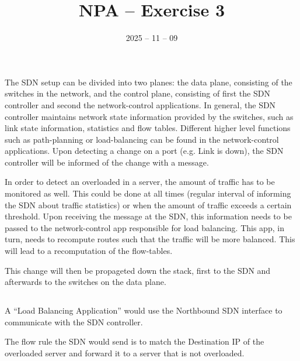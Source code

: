 \documentclass{article}
\date{2025 -- 11 -- 09}
\title{NPA -- Exercise 3}
\begin{document}
\maketitle

    \section{}
            
        \subsection{}
            The SDN setup can be divided into two planes: the data plane, consisting of the switches in the network, and the control plane, consisting of first the SDN controller and second the network-control applications.
            In general, the SDN controller maintains network state information provided by the switches, such as link state information, statistics and flow tables. Different higher level functions such as path-planning or load-balancing can be found in the network-control applications.
            Upon detecting a change on a port (e.g. Link is down), the SDN controller will be informed of the change with a message. 

            In order to detect an overloaded in a server, the amount of traffic has to be monitored as well. This could be done at all times (regular interval of informing the SDN about traffic statistics) or when the amount of traffic exceeds a certain threshold. 
            Upon receiving the message at the SDN, this information needs to be passed to the network-control app responsible for load balancing. This app, in turn, needs to recompute routes such that the traffic will be more balanced. This will lead to a recomputation of the flow-tables. 

            This change will then be propageted down the stack, first to the SDN and afterwards to the switches on the data plane.
            
        \subsection{}
            A \enquote{Load Balancing Application} would use the Northbound SDN interface to communicate with the SDN controller. 

            The flow rule the SDN would send is to match the Destination IP of the overloaded server and forward it to a server that is not overloaded.
\end{document}

